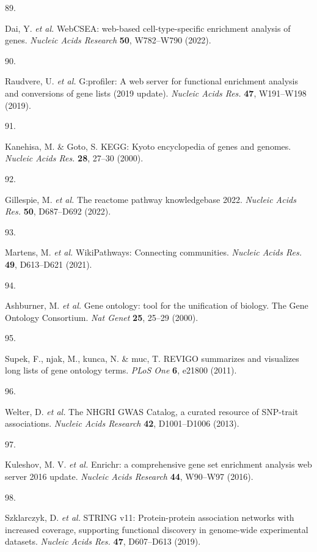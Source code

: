 \documentclass[
  11,
  a4paper,
]{article}
\newlength{\cslhangindent}
\newlength{\csllabelwidth}
\newenvironment{CSLReferences}[2] %
 {\begin{list}{}{%
  \setlength{\itemindent}{0pt}
  \setlength{\leftmargin}{0pt}
  \setlength{\parsep}{0pt}
  \ifodd #1
   \setlength{\leftmargin}{\cslhangindent}
   \setlength{\itemindent}{-1\cslhangindent}
  \fi
  \setlength{\itemsep}{#2\baselineskip}}}
 {\end{list}}
\newcommand{\CSLLeftMargin}[1]{\parbox[t]{\csllabelwidth}{\strut#1\strut}}
\newcommand{\CSLRightInline}[1]{\parbox[t]{\linewidth - \csllabelwidth}{\strut#1\strut}}
\begin{document}
\begin{CSLReferences}{0}{0}
\CSLLeftMargin{89. }%
\CSLRightInline{Dai, Y. \emph{et al.} {WebCSEA: web-based
cell-type-specific enrichment analysis of genes}. \emph{Nucleic Acids
Research} \textbf{50}, W782--W790 (2022).}

\CSLLeftMargin{90. }%
\CSLRightInline{Raudvere, U. \emph{et al.} G:profiler: A web server for
functional enrichment analysis and conversions of gene lists (2019
update). \emph{Nucleic Acids Res.} \textbf{47}, W191--W198 (2019).}

\CSLLeftMargin{91. }%
\CSLRightInline{Kanehisa, M. \& Goto, S. {KEGG}: Kyoto encyclopedia of
genes and genomes. \emph{Nucleic Acids Res.} \textbf{28}, 27--30
(2000).}

\CSLLeftMargin{92. }%
\CSLRightInline{Gillespie, M. \emph{et al.} The reactome pathway
knowledgebase 2022. \emph{Nucleic Acids Res.} \textbf{50}, D687--D692
(2022).}

\CSLLeftMargin{93. }%
\CSLRightInline{Martens, M. \emph{et al.} {WikiPathways}: Connecting
communities. \emph{Nucleic Acids Res.} \textbf{49}, D613--D621 (2021).}

\CSLLeftMargin{94. }%
\CSLRightInline{Ashburner, M. \emph{et al.} {{G}ene ontology: tool for
the unification of biology. {T}he {G}ene {O}ntology {C}onsortium}.
\emph{Nat Genet} \textbf{25}, 25--29 (2000).}

\CSLLeftMargin{95. }%
\CSLRightInline{Supek, F., njak, M., kunca, N. \& muc, T.
{{R}{E}{V}{I}{G}{O} summarizes and visualizes long lists of gene
ontology terms}. \emph{PLoS One} \textbf{6}, e21800 (2011).}

\CSLLeftMargin{96. }%
\CSLRightInline{Welter, D. \emph{et al.} {The NHGRI GWAS Catalog, a
curated resource of SNP-trait associations}. \emph{Nucleic Acids
Research} \textbf{42}, D1001--D1006 (2013).}

\CSLLeftMargin{97. }%
\CSLRightInline{Kuleshov, M. V. \emph{et al.} {Enrichr: a comprehensive
gene set enrichment analysis web server 2016 update}. \emph{Nucleic
Acids Research} \textbf{44}, W90--W97 (2016).}

\CSLLeftMargin{98. }%
\CSLRightInline{Szklarczyk, D. \emph{et al.} {STRING} v11:
Protein-protein association networks with increased coverage, supporting
functional discovery in genome-wide experimental datasets. \emph{Nucleic
Acids Res.} \textbf{47}, D607--D613 (2019).}


\end{CSLReferences}
\end{document}

